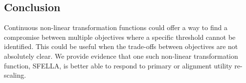 \subsection{Conclusion}

Continuous non-linear transformation functions could offer a way to find a compromise between multiple objectives where a specific threshold cannot be identified. This could be useful when the trade-offs between objectives are not absolutely clear. We provide evidence that one such non-linear transformation function, SFELLA, is better able to respond to primary or alignment utility re-scaling.